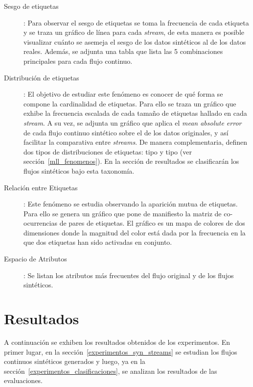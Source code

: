 \begin{description}

	\item[Sesgo de etiquetas]: Para observar el sesgo de etiquetas se toma la
	      frecuencia de cada etiqueta y se traza un gráfico de línea para cada
	      \textit{stream}, de esta manera es posible visualizar cuánto se asemeja
	      el sesgo de los datos sintéticos al de los datos reales. Además, se
	      adjunta una tabla que lista las 5 combinaciones principales para cada
	      flujo continuo.

	\item[Distribución de etiquetas]: El objetivo de estudiar este fenómeno es
	      conocer de qué forma se compone la cardinalidad de etiquetas. Para ello
	      se traza un gráfico que exhibe la frecuencia escalada de cada tamaño de
	      etiquetas hallado en cada \textit{stream}. A su vez, se adjunta un
	      gráfico que aplica el \textit{mean absolute error} de cada flujo
	      continuo sintético sobre el de los datos originales, y así facilitar la
	      comparativa entre \textit{streams}. De manera complementaria,
	      \citeauthor{read_generating_2009} definen dos tipos de distribuciones de
	      etiquetas: tipo  y tipo  (ver
	      sección~\ref{mll_fenomenos}). En la sección de resultados se
	      clasificarán los flujos sintéticos bajo esta taxonomía.

	\item[Relación entre Etiquetas]: Este fenómeno se estudia observando la
	      aparición mutua de etiquetas. Para ello se genera un gráfico que pone de
	      manifiesto la matriz de co-ocurrencias de pares de etiquetas. El gráfico
	      es un mapa de colores de dos dimensiones donde la magnitud del color
	      está dada por la frecuencia en la que dos etiquetas han sido activadas
	      en conjunto.

	\item[Espacio de Atributos]: Se listan los atributos más frecuentes del
	      flujo original y de los flujos sintéticos.

\end{description}


\section{Resultados}
\label{experimentos_resultados}

A continuación se exhiben los resultados obtenidos de los experimentos. En
primer lugar, en la sección~\ref{experimentos_syn_streams} se estudian los
flujos continuos sintéticos generados y luego, ya en la
sección~\ref{experimentos_clasificaciones}, se analizan los resultados de las
evaluaciones.

